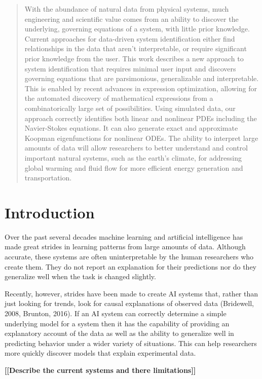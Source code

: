\documentclass{article}
\newcommand{\todo}[1]{\textbf{[[#1]]}}
\begin{document}
\begin{abstract}
With the abundance of natural data from physical systems, much engineering and scientific value comes from an ability to discover the underlying, governing equations of a system, with little prior knowledge. Current approaches for data-driven system identification either find relationships in the data that aren't interpretable, or require significant prior knowledge from the user. This work describes a new approach to system identification that requires minimal user input and discovers governing equations that are parsimonious, generalizable and interpretable. This is enabled by recent advances in expression optimization, allowing for the automated discovery of mathematical expressions from a combinatorically large set of possibilities. Using simulated data, our approach correctly identifies both linear and nonlinear PDEs including the Navier-Stokes equations. It can also generate exact and approximate Koopman eigenfunctions for nonlinear ODEs. The ability to interpret large amounts of data will allow researchers to better understand and control important natural systems, such as the earth’s climate, for addressing global warming and fluid flow for more efficient energy generation and transportation.
\end{abstract}

\section{Introduction}
\label{introduction}

Over the past several decades machine learning and artificial intelligence has made great strides in learning patterns from large amounts of data. Although accurate, these systems are often uninterpretable by the human researchers who create them. They do not report an explanation for their predictions nor do they generalize well when the task is changed slightly.

Recently, however, strides have been made to create AI systems that, rather than just looking for trends, look for causal explanations of observed data (Bridewell, 2008, Brunton, 2016). If an AI system can correctly determine a simple underlying model for a system then it has the capability of providing an explanatory account of the data as well as the ability to generalize well in predicting behavior under a wider variety of situations. This can help researchers more quickly discover models that explain experimental data.

\todo{Describe the current systems and there limitations}
\end{document}

